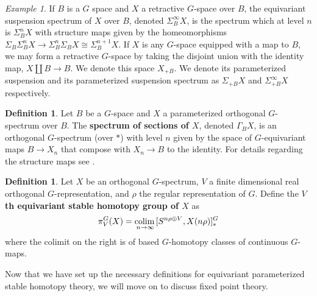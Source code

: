 \documentclass[11pt]{amsart}
\newcommand{\colim}{\textup{colim}\,}
\theoremstyle{plain}   %
\theoremstyle{definition}
\newtheorem{df}[thm]{Definition}
\theoremstyle{remark}
\newtheorem{ex}[thm]{Example}
\numberwithin{equation}{section}
\begin{document}
\begin{ex}
If $B$ is a $G$ space and $X$ a retractive $G$-space over $B$, the equivariant suspension spectrum of $X$ over $B$, denoted $\Sigma_B^\infty X$, is the spectrum which at level $n$ is $\Sigma_B^nX$ with structure maps given by the homeomorphisms $\Sigma_B\Sigma_B^nX\to \Sigma_B^n\Sigma_B X \cong \Sigma_B^{n+1} X$. If $X$ is any $G$-space equipped with a map to $B$, we may form a retractive $G$-space by taking the disjoint union with the identity map, $X\amalg B\to B$. We denote this space $X_{+B}$. We denote its parameterized suspension and its parameterized suspension spectrum as $\Sigma_{+B} X$ and $\Sigma^\infty_{+B} X$ respectively. 
\end{ex}

\begin{df}
Let $B$ be a $G$-space and $X$ a parameterized orthogonal $G$-spectrum over $B$. The \textbf{spectrum of sections of $X$}, denoted $\Gamma_B X$, is an orthogonal $G$-spectrum (over $*$) with level $n$ given by the space of $G$-equivariant maps $B\to X_n$ that compose with $X_n\to B$ to the identity. For details regarding the structure maps see \cite[Section 4.3]{malkiewich_convenient}.
\end{df}

\begin{df}
Let $X$ be an orthogonal $G$-spectrum, $V$ a finite dimensional real orthogonal $G$-representation, and $\rho$ the regular representation of $G$. Define the \textbf{$V$th equivariant stable homotopy group of $X$} as 
\[
\pi_V^G(X) = \underset{n\to\infty}{\colim}[S^{n\rho\oplus V},X(n\rho)]_*^G
\]
where the colimit on the right is of based $G$-homotopy classes of continuous $G$-maps.
\end{df}

Now that we have set up the necessary definitions for equivariant parameterized stable homotopy theory, we will move on to discuss fixed point theory. 
\end{document}
